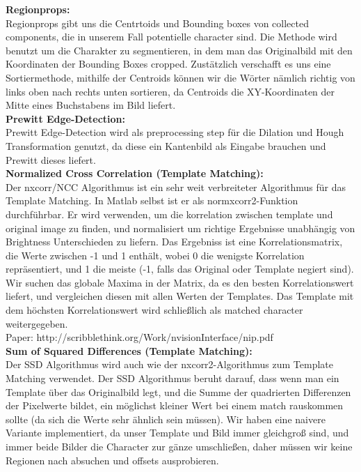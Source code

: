 \documentclass[paper=A4, deutsch]{scrartcl}
\begin{document}
\textbf{Regionprops:}\\
Regionprops gibt uns die Centrtoids und Bounding boxes von collected components, die in unserem Fall potentielle character sind. Die Methode wird benutzt um die Charakter zu segmentieren, in dem man das Originalbild mit den Koordinaten der Bounding Boxes cropped. Zustätzlich verschafft es uns eine Sortiermethode, mithilfe der Centroids können wir die Wörter nämlich richtig von links oben nach rechts unten sortieren,
da Centroids die XY-Koordinaten der Mitte eines Buchstabens im Bild liefert.\\

\textbf{Prewitt Edge-Detection:}\\
Prewitt Edge-Detection wird als preprocessing step für die Dilation und Hough Transformation genutzt, da diese ein Kantenbild als Eingabe brauchen und Prewitt dieses liefert.\\

\textbf{Normalized Cross Correlation (Template Matching):}\\
Der nxcorr/NCC Algorithmus ist ein sehr weit verbreiteter Algorithmus für das Template Matching. In Matlab selbst ist er als normxcorr2-Funktion durchführbar. 
Er wird verwenden, um die korrelation zwischen template und original image zu finden, und normalisiert um richtige Ergebnisse unabhängig von Brightness 
Unterschieden zu liefern. Das Ergebniss ist eine Korrelationsmatrix, die Werte zwischen -1 und 1 enthält, wobei 0 die wenigste Korrelation repräsentiert, 
und 1 die meiste (-1, falls das Original oder Template negiert sind). Wir suchen das globale Maxima in der Matrix, da es den besten Korrelationswert liefert, 
und vergleichen diesen mit allen Werten der Templates. Das Template mit dem höchsten Korrelationswert wird schließlich als matched character weitergegeben.\\

Paper: http://scribblethink.org/Work/nvisionInterface/nip.pdf\\

\textbf{Sum of Squared Differences (Template Matching):}\\
Der SSD Algorithmus wird auch wie der nxcorr2-Algorithmus zum Template Matching verwendet. Der SSD Algorithmus beruht darauf, dass wenn man ein Template 
über das Originalbild legt, und die Summe der quadrierten Differenzen der Pixelwerte bildet, ein möglichst kleiner Wert bei einem match rauskommen sollte (da 
sich die Werte sehr ähnlich sein müssen). Wir haben eine naivere Variante implementiert, da unser Template
und Bild immer gleichgroß sind, und immer beide Bilder die Character zur gänze umschließen, daher müssen wir keine Regionen nach absuchen und offsets ausprobieren.\\
\\
\end{document}
